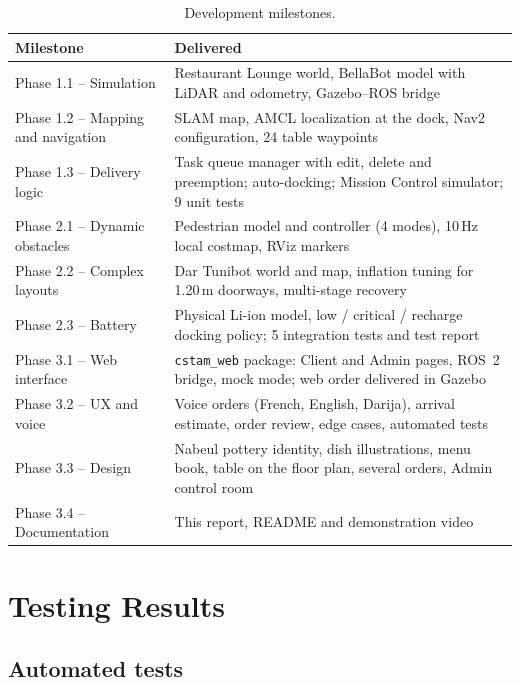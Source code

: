 \documentclass[11pt,a4paper]{article}
\begin{document}
\begin{table}[H]
\centering
\small
\begin{tabularx}{\linewidth}{l L}
\toprule
\textbf{Milestone} & \textbf{Delivered} \\
\midrule
Phase 1.1 -- Simulation & Restaurant Lounge world, BellaBot model with LiDAR and odometry, Gazebo--ROS bridge \\
Phase 1.2 -- Mapping and navigation & SLAM map, AMCL localization at the dock, Nav2 configuration, 24 table waypoints \\
Phase 1.3 -- Delivery logic & Task queue manager with edit, delete and preemption; auto-docking; Mission Control simulator; 9 unit tests \\
\midrule
Phase 2.1 -- Dynamic obstacles & Pedestrian model and controller (4 modes), 10\,Hz local costmap, RViz markers \\
Phase 2.2 -- Complex layouts & Dar Tunibot world and map, inflation tuning for 1.20\,m doorways, multi-stage recovery \\
Phase 2.3 -- Battery & Physical Li-ion model, low / critical / recharge docking policy; 5 integration tests and test report \\
\midrule
Phase 3.1 -- Web interface & \texttt{cstam\_web} package: Client and Admin pages, ROS~2 bridge, mock mode; web order delivered in Gazebo \\
Phase 3.2 -- UX and voice & Voice orders (French, English, Darija), arrival estimate, order review, edge cases, automated tests \\
Phase 3.3 -- Design & Nabeul pottery identity, dish illustrations, menu book, table on the floor plan, several orders, Admin control room \\
Phase 3.4 -- Documentation & This report, README and demonstration video \\
\bottomrule
\end{tabularx}
\caption{Development milestones.}
\end{table}

\section{Testing Results}

\subsection{Automated tests}
\end{document}
